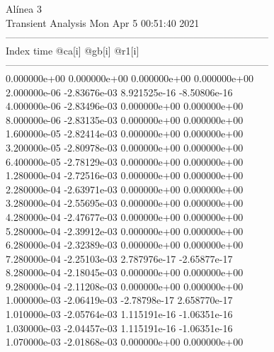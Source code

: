                                   Alínea 3 \\ \hline
                                   Transient Analysis  Mon Apr  5 00:51:40  2021\\ \hline
--------------------------------------------------------------------------------\\ \hline
Index   time            @ca[i]          @gb[i]          @r1[i]          \\ \hline
--------------------------------------------------------------------------------\\ 	0.000000e+00	0.000000e+00	0.000000e+00	0.000000e+00	\\ 	2.000000e-06	-2.83676e-03	8.921525e-16	-8.50806e-16	\\ 	4.000000e-06	-2.83496e-03	0.000000e+00	0.000000e+00	\\ 	8.000000e-06	-2.83135e-03	0.000000e+00	0.000000e+00	\\ 	1.600000e-05	-2.82414e-03	0.000000e+00	0.000000e+00	\\ 	3.200000e-05	-2.80978e-03	0.000000e+00	0.000000e+00	\\ 	6.400000e-05	-2.78129e-03	0.000000e+00	0.000000e+00	\\ 	1.280000e-04	-2.72516e-03	0.000000e+00	0.000000e+00	\\ 	2.280000e-04	-2.63971e-03	0.000000e+00	0.000000e+00	\\ 	3.280000e-04	-2.55695e-03	0.000000e+00	0.000000e+00	\\ 	4.280000e-04	-2.47677e-03	0.000000e+00	0.000000e+00	\\ 	5.280000e-04	-2.39912e-03	0.000000e+00	0.000000e+00	\\ 	6.280000e-04	-2.32389e-03	0.000000e+00	0.000000e+00	\\ 	7.280000e-04	-2.25103e-03	2.787976e-17	-2.65877e-17	\\ 	8.280000e-04	-2.18045e-03	0.000000e+00	0.000000e+00	\\ 	9.280000e-04	-2.11208e-03	0.000000e+00	0.000000e+00	\\ 	1.000000e-03	-2.06419e-03	-2.78798e-17	2.658770e-17	\\ 	1.010000e-03	-2.05764e-03	1.115191e-16	-1.06351e-16	\\ 	1.030000e-03	-2.04457e-03	1.115191e-16	-1.06351e-16	\\ 	1.070000e-03	-2.01868e-03	0.000000e+00	0.000000e+00	\\ \hline
